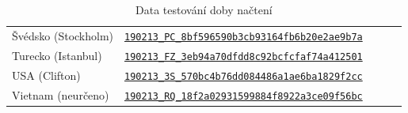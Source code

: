 \documentclass[a4paper, 12pt]{article}
\begin{document}
\begin{table}[H]
\begin{tabular}{*5l}
    Švédsko (Stockholm)             & \href{https://www.webpagetest.org/result/190213_PC_8bf596590b3cb93164fb6b20e2ae9b7a}{\texttt{190213\_PC\_8bf596590b3cb93164fb6b20e2ae9b7a}} \\
    Turecko (Istanbul)              & \href{https://www.webpagetest.org/result/190213_FZ_3eb94a70dfdd8c92bcfcfaf74a412501}{\texttt{190213\_FZ\_3eb94a70dfdd8c92bcfcfaf74a412501}} \\
    USA (Clifton)                   & \href{https://www.webpagetest.org/result/190213_3S_570bc4b76dd084486a1ae6ba1829f2cc}{\texttt{190213\_3S\_570bc4b76dd084486a1ae6ba1829f2cc}} \\
    Vietnam (neurčeno)              & \href{https://www.webpagetest.org/result/190213_RQ_18f2a02931599884f8922a3ce09f56bc}{\texttt{190213\_RQ\_18f2a02931599884f8922a3ce09f56bc}} \\
    \bottomrule
  \end{tabular}
  \caption{Data testování doby načtení}
  \label{tab:Data testování doby načtení}
\end{table}
\end{document}
